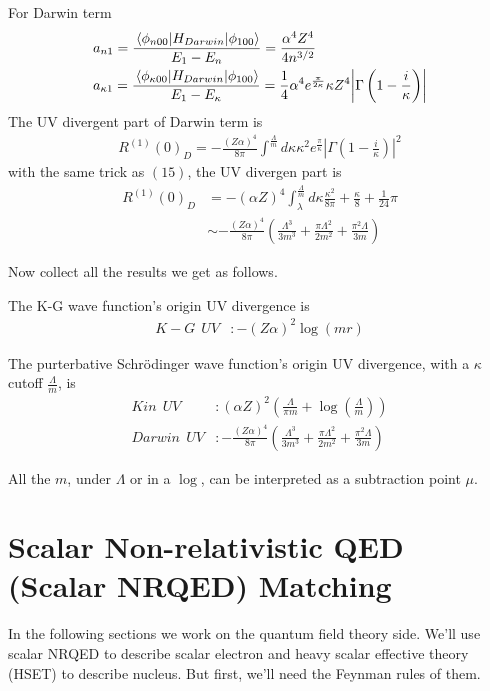 \documentclass[aps,prd,preprint,showkeys,10pt]{revtex4-1}
\newcommand{\ka}{\kappa}
\begin{document}
For Darwin term
\begin{align*}
	&a_{n1}=\frac{\mel{\phi_{n00}}{H_{Darwin}}{\phi_{100}}}{E_1-E_n}=\frac{\alpha ^4 Z^4}{4 n^{3/2}}\\
	&a_{\ka1}=\frac{\mel{\phi_{\ka00}}{H_{Darwin}}{\phi_{100}}}{E_1-E_{\ka}}=\frac{1}{4} \alpha ^4 e^{\frac{\pi }{2 \kappa }} \kappa  Z^4 \abs {\Gamma \left(1-\frac{i}{\kappa }\right)}
\end{align*}
The UV divergent part of Darwin term is
\begin{align}
	R^{(1)}(0)_D=-\frac{(Z\alpha)^4}{8\pi}\int^\frac{\Lambda}{m}d\ka\ka^2e^\frac{\pi}{\ka}|\Gamma(1-\frac{i}{\ka})|^2
\end{align}
with the same trick as $(15)$, the UV divergen part is
\begin{align}
	R^{(1)}(0)_{D} & =-(\alpha Z)^4\int_\lambda^\frac{\Lambda}{m}d\ka\frac{\ka^2}{8\pi}+\frac{\ka}{8}+\frac{1}{24}\pi         \\
	                  & \sim -\frac{(Z\alpha)^4}{8\pi}(\frac{\Lambda^3}{3m^3}+\frac{\pi\Lambda^2}{2m^2}+\frac{\pi^2\Lambda}{3m})
\end{align}

Now collect all the results we get as follows.

The K-G wave function's origin UV divergence is
\begin{align}
	K-G\ \ UV & :-(Z\alpha)^2\log(m r)
\end{align}

The purterbative Schr\"odinger wave function's origin UV divergence, with a $\ka$ cutoff $\frac{\Lambda}{m}$, is
\begin{align}
	Kin\ \  UV    & :(\alpha Z)^2(\frac{\Lambda}{\pi m}+\log(\frac{\Lambda}{m}))                                         \\
	Darwin\ \  UV & :-\frac{(Z\alpha)^4}{8\pi}(\frac{\Lambda^3}{3m^3}+\frac{\pi\Lambda^2}{2m^2}+\frac{\pi^2\Lambda}{3m})
\end{align}

All the $m$, under $\Lambda$ or in a $\log$, can be interpreted as a subtraction point $\mu$.

\section{Scalar Non-relativistic QED (Scalar NRQED) Matching}
In the following sections we work on the quantum field theory side. We'll use scalar NRQED to describe scalar electron and heavy scalar effective theory (HSET) to describe nucleus. But first, we'll need the Feynman rules of them. 
\end{document}
